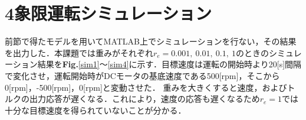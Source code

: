 \documentclass[a4paper,12pt]{jarticle}
\begin{document}
\section{4象限運転シミュレーション}

前節で得たモデルを用いてMATLAB上でシミュレーションを行ない，その結果を出力した．本課題では重みがそれぞれ$ r_e = 0.001, ~ 0.01, ~ 0.1, ~ 1 $のときのシミュレーション結果を{\bf Fig.}\ref{sim1}〜\ref{sim4}に示す．目標速度は運転の開始時より20[s]間隔で変化させ，運転開始時がDCモータの基底速度である500[rpm]，そこから0[rpm]，-500[rpm]，0[rpm]と変動させた．
重みを大きくすると速度，およびトルクの出力応答が遅くなる．これにより，速度の応答も遅くなるため$ r_e = 1 $では十分な目標速度を得られていないことが分かる．
\end{document}
